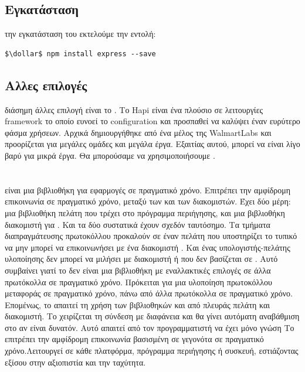 \subsection*{Εγκατάσταση}
 την εγκατάσταση του  εκτελούμε την εντολή:
    \begin{lstlisting}[language=command.com]
    $\dollar$ npm install express --save
    \end{lstlisting}

\subsection*{Αλλες επιλογές}
 διάσημη άλλες επιλογή είναι το . Το Hapi είναι ένα πλούσιο σε λειτουργίες framework το οποίο ευνοεί το configuration και προσπαθεί να καλύψει έναν ευρύτερο φάσμα χρήσεων. Αρχικά δημιουργήθηκε από ένα μέλος της WalmartLabs και προορίζεται για μεγάλες ομάδες και μεγάλα έργα. Εξαιτίας αυτού, μπορεί να είναι λίγο βαρύ για μικρά έργα. Θα μπορούσαμε να χρησιμοποιήσουμε .


\section{}
  είναι μια βιβλιοθήκη  για εφαρμογές  σε πραγματικό χρόνο. Επιτρέπει την αμφίδρομη επικοινωνία σε πραγματικό χρόνο, μεταξύ των  και των διακομιστών. Έχει δύο μέρη: μια βιβλιοθήκη πελάτη που τρέχει στο πρόγραμμα περιήγησης, και μια βιβλιοθήκη διακομιστή για . Και τα δύο συστατικά έχουν σχεδόν ταυτόσημο. Τα τμήματα διαπραγμάτευσης πρωτοκόλλου προκαλούν σε έναν πελάτη που υποστηρίζει το τυπικό  να μην μπορεί να επικοινωνήσει με ένα διακομιστή . Και ένας υπολογιστής-πελάτης υλοποίησης  δεν μπορεί να μιλήσει με διακομιστή  ή  που δεν βασίζεται σε . Αυτό συμβαίνει γιατί το  δεν είναι μια βιβλιοθήκη  με εναλλακτικές επιλογές σε άλλα πρωτόκολλα σε πραγματικό χρόνο. Πρόκειται για μια  υλοποίηση πρωτοκόλλου μεταφοράς σε πραγματικό χρόνο, πάνω από άλλα πρωτόκολλα σε πραγματικό χρόνο. Επομένως, το  απαιτεί τη χρήση των βιβλιοθηκών  και από πλευράς πελάτη και διακομιστή. Το  χειρίζεται τη σύνδεση με διαφάνεια και θα γίνει αυτόματη αναβάθμιση στο  αν είναι δυνατόν. Αυτό απαιτεί από τον προγραμματιστή να έχει μόνο γνώση   Το  επιτρέπει την αμφίδρομη επικοινωνία βασισμένη σε γεγονότα σε πραγματικό χρόνο.Λειτουργεί σε κάθε πλατφόρμα, πρόγραμμα περιήγησης ή συσκευή, εστιάζοντας εξίσου στην αξιοπιστία και την ταχύτητα.

